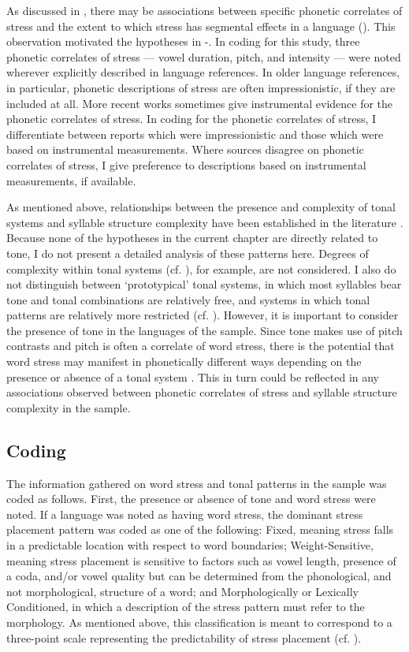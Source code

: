   As discussed in , there may be associations between specific phonetic correlates of stress and the extent to which stress has segmental effects in a language (\citealt{BybeeEtAl1998,Schiering2007}). This observation motivated the hypotheses in -. In coding for this study, three phonetic correlates of stress — vowel duration, pitch, and intensity — were noted wherever explicitly described in language references. In older language references, in particular, phonetic descriptions of stress are often impressionistic, if they are included at all. More recent works sometimes give instrumental evidence for the phonetic correlates of stress. In coding for the phonetic correlates of stress, I differentiate between reports which were impressionistic and those which were based on instrumental measurements. Where sources disagree on phonetic correlates of stress, I give preference to descriptions based on instrumental measurements, if available.

  As mentioned above, relationships between the presence and complexity of tonal systems and syllable structure complexity have been established in the literature \citep{Maddieson2013d}. Because none of the hypotheses in the current chapter are directly related to tone, I do not present a detailed analysis of these patterns here. Degrees of complexity within tonal systems (cf. \citealt{Maddieson2013d}), for example, are not considered. I also do not distinguish between ‘prototypical’ tonal systems, in which most syllables bear tone and tonal combinations are relatively free, and systems in which tonal patterns are relatively more restricted (cf. \citealt{Hyman2009}). However, it is important to consider the presence of tone in the languages of the sample. Since tone makes use of pitch contrasts and pitch is often a correlate of word stress, there is the potential that word stress may manifest in phonetically different ways depending on the presence or absence of a tonal system \citep{Gordon2011}. This in turn could be reflected in any associations observed between phonetic correlates of stress and syllable structure complexity in the sample. 

\subsection{Coding}\label{sec:5.2.2}

  The information gathered on word stress and tonal patterns in the sample was coded as follows. First, the presence or absence of tone and word stress were noted. If a language was noted as having word stress, the dominant stress placement pattern was coded as one of the following: Fixed, meaning stress falls in a predictable location with respect to word boundaries; Weight-Sensitive, meaning stress placement is sensitive to factors such as vowel length, presence of a coda, and/or vowel quality but can be determined from the phonological, and not morphological, structure of a word; and Morphologically or Lexically Conditioned, in which a description of the stress pattern must refer to the morphology. As mentioned above, this classification is meant to correspond to a three-point scale representing the predictability of stress placement (cf. \citealt{Schiering2007}). 

